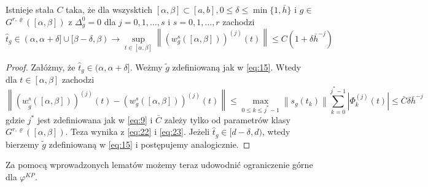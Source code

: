 \documentclass[oik, pdftex, robocza, man]{mgrwms}
\begin{document}
    \begin{lemma} \label{lem:3}
        Istnieje stała $C$ taka, że dla wszysktich $[\alpha, \beta] \subset [a, b], 0 \leq \delta \leq \min \{1, \bar{h}\}$ i $g \in$ $G^{r, \varrho}([\alpha, \beta])$ z $\Delta_{g}^{0}=0$ dla $j=0,1, \ldots, s$ i $s=0,1, \ldots, r$ zachodzi
        \begin{equation*}
            \hat{t}_{g} \in(\alpha, \alpha+\delta] \cup[\beta-\delta, \beta) \longrightarrow \sup _{t \in[\alpha, \beta]}\left\|\left(w_{g}^{s}([\alpha, \beta])\right)^{(j)}(t)\right\| \leq C\left(1+\delta \bar{h}^{-j}\right)
        \end{equation*}
    \end{lemma}
    \begin{proof}
        Załóżmy, że $\hat{t}_{g} \in (\alpha, \alpha+\delta]$. Weżmy $\tilde{g}$ zdefiniowaną jak w \eqref{eq:15}. Wtedy dla $t \in[\alpha, \beta]$ zachodzi
        \begin{equation} \label{eq:24}
            \left\|\left(w_{\tilde{g}}^{s}([\alpha, \beta])\right)^{(j)}(t)-\left(w_{g}^{s}([\alpha, \beta])\right)^{(j)}(t)\right\| \leq \max _{0 \leq k \leq j^{*}-1}\left\|s_{g}\left(t_{k}\right)\right\| \sum_{k=0}^{j^{*}-1}\left|\Phi_{k}^{(j)}(t)\right| \leq \bar{C} \delta \bar{h}^{-j}
        \end{equation}
        gdzie $j^{*}$ jest zdefiniowana jak w \eqref{eq:9} i $\bar{C}$  zależy tylko od parametrów klasy $G^{r, \varrho}([\alpha, \beta])$. Teza wynika z \eqref{eq:22} i \eqref{eq:23}. Jeżeli $\hat{t}_{g} \in[d-\delta, d)$, wtedy bierzemy $\tilde{g}$ zdefiniowaną w \eqref{eq:15} i postępujemy analogicznie.
    \end{proof}

    Za pomocą wprowadzonych lematów możemy teraz udowodnić ograniczenie górne dla $\varphi^{KP}$.
\end{document}

